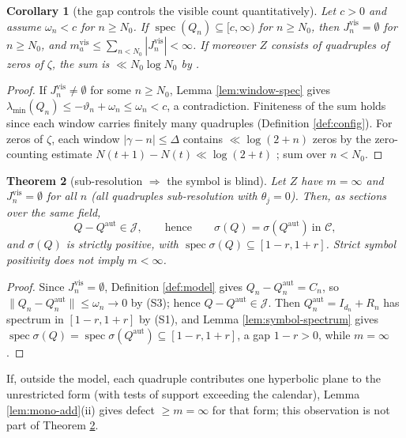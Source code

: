 \documentclass[11pt,reqno]{amsart}
\newtheorem{theorem}{Theorem}[section]
\newtheorem{corollary}[theorem]{Corollary}
\theoremstyle{definition}
\newcommand{\Jc}{\mathcal{J}}
\newcommand{\Cor}{\mathcal{C}}
\newcommand{\spec}{\operatorname{spec}}
\newcommand{\Qaut}{Q^{\mathrm{aut}}}
\begin{document}
\begin{corollary}[the gap controls the visible count quantitatively]
\label{cor:gap-quant}
Let \(c>0\) and assume \(\omega_n<c\) for \(n\geq N_0\). If
\(\spec(Q_n)\subseteq[c,\infty)\) for \(n\geq N_0\), then
\(J_n^{\mathrm{vis}}=\emptyset\) for \(n\geq N_0\), and
\(m_a^{\mathrm{vis}}\leq\sum_{n<N_0}|J_n^{\mathrm{vis}}|<\infty\). If moreover
\(Z\) consists of quadruples of zeros of \(\zeta\), the sum is
\(\ll N_0\log N_0\) by \cite[Thm.~5.8]{IwaniecKowalski}.
\end{corollary}

\begin{proof}
If \(J_n^{\mathrm{vis}}\neq\emptyset\) for some \(n\geq N_0\), Lemma
\ref{lem:window-spec} gives \(\lambda_{\min}(Q_n)\leq-\vartheta_n+\omega_n
\leq\omega_n<c\), a contradiction. Finiteness of the sum holds since each window carries finitely
many quadruples (Definition \ref{def:config}). For zeros of \(\zeta\), each window \(|\gamma-n|\leq\Delta\) contains
\(\ll\log(2+n)\) zeros by the zero-counting estimate \(N(t+1)-N(t)\ll\log(2+t)\)
\cite[Thm.~5.8]{IwaniecKowalski}; sum over \(n<N_0\).
\end{proof}

\begin{theorem}[sub-resolution \(\Rightarrow\) the symbol is blind]
\label{thm:blind}
Let \(Z\) have \(m=\infty\) and \(J_n^{\mathrm{vis}}=\emptyset\) for all \(n\)
(all quadruples sub-resolution with \(\theta_j=0\)). Then, as sections over the
same field,
\[
Q-\Qaut\in\Jc,\qquad\text{hence}\qquad\sigma(Q)=\sigma(\Qaut)\ \text{in }\Cor,
\]
and \(\sigma(Q)\) is strictly positive, with
\(\spec\sigma(Q)\subseteq[1-r,1+r]\). Strict symbol positivity does \emph{not}
imply \(m<\infty\).
\end{theorem}

\begin{proof}
Since \(J_n^{\mathrm{vis}}=\emptyset\), Definition \ref{def:model} gives
\(Q_n-\Qaut_n=C_n\), so \(\|Q_n-\Qaut_n\|\leq\omega_n\to0\) by (S3); hence
\(Q-\Qaut\in\Jc\). Then \(\Qaut_n=I_{d_n}+R_n\) has spectrum in \([1-r,1+r]\)
by (S1), and Lemma \ref{lem:symbol-spectrum} gives
\(\spec\sigma(Q)=\spec\sigma(\Qaut)\subseteq[1-r,1+r]\), a gap \(1-r>0\),
while \(m=\infty\).
\end{proof}

If, outside the model, each quadruple contributes one hyperbolic plane to the
unrestricted form (with tests of support exceeding the calendar), Lemma
\ref{lem:mono-add}(ii) gives defect \(\geq m=\infty\) for that form; this
observation is not part of Theorem \ref{thm:blind}.
\end{document}
